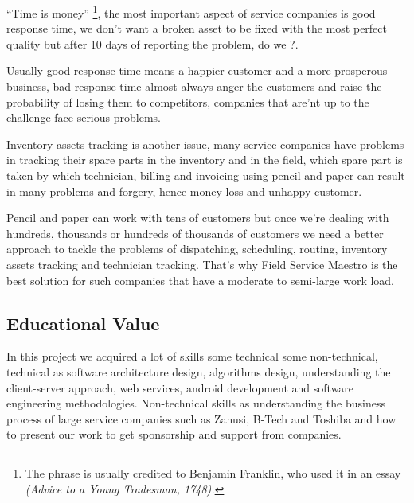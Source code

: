 ``Time is money'' \footnote{The phrase is usually credited to Benjamin Franklin, who used it in an essay \textit{(Advice to a Young Tradesman, 1748).}}, the most important aspect of service companies is good response time, we don't want a broken asset to be fixed with the most perfect quality but after 10 days of reporting the problem, do we ?. 

Usually good response time means a happier customer and a more prosperous business, bad response time almost always anger the customers and raise the probability of losing them to competitors, companies that are'nt up to the challenge face serious problems.

Inventory assets tracking is another issue, many service companies have problems in tracking their spare parts in the inventory and in the field, which spare part is taken by which technician, billing and invoicing using pencil and paper can result in many problems and forgery, hence money loss and unhappy customer.

Pencil and paper can work with tens of customers but once we're dealing with hundreds, thousands or hundreds of thousands of customers we need a better approach to tackle the problems of dispatching, scheduling, routing, inventory assets tracking and technician tracking. That's why Field Service Maestro is the best solution for such companies that have a moderate to semi-large work load.

\subsection{Educational Value}
	In this project we acquired a lot of skills some technical some non-technical, technical as software architecture design, algorithms design, understanding the client-server approach, web services, android development and software engineering methodologies. Non-technical skills as understanding the business process of large service companies such as Zanusi, B-Tech and Toshiba and how to present our work to get sponsorship and support from companies.